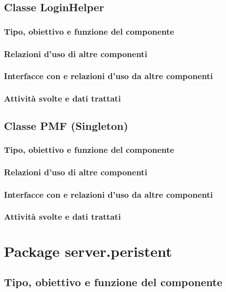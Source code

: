 \subsection{Classe LoginHelper}
\subsubsection*{Tipo, obiettivo e funzione del componente}
\subsubsection*{Relazioni d'uso di altre componenti}
\subsubsection*{Interfacce con e relazioni d'uso da altre componenti}
\subsubsection*{Attivit\`a svolte e dati trattati}

\newpage
\subsection{Classe PMF (Singleton)}
\subsubsection*{Tipo, obiettivo e funzione del componente}
\subsubsection*{Relazioni d'uso di altre componenti}
\subsubsection*{Interfacce con e relazioni d'uso da altre componenti}
\subsubsection*{Attivit\`a svolte e dati trattati}

\section{Package server.peristent} %
\subsection*{Tipo, obiettivo e funzione del componente}
